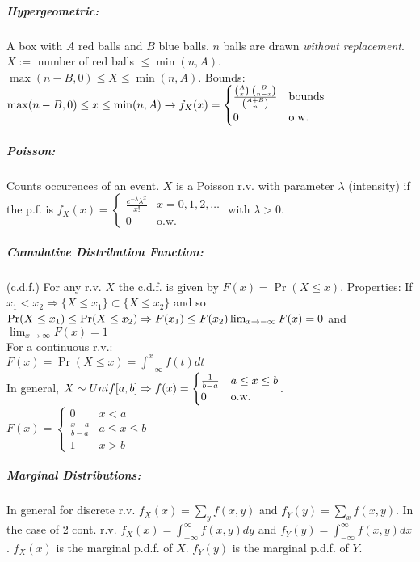 \documentclass[landscape,10pt]{article}
\begin{document}
\begin{multicols}{4}
    \subparagraph*{Hypergeometric: } A box with \(A\) red balls and \(B\) blue balls. \(n\) balls are drawn \textit{without replacement}. \(X :=\) number of red balls \(\leq \min(n, A)\). \(\max(n-B, 0) \leq X \leq \min(n,A)\). Bounds: \(\max(n-B,0) \leq x \leq \min(n,A)\\\rightarrow f_X(x) = 
    \begin{cases}
    \frac{ {A \choose x} \cdot {B \choose n - x}}{{A + B \choose n}}     & \text{bounds}    \\
    0   &   \text{o.w.}
    \end{cases}
    \)
        
    \subparagraph*{Poisson: }
        Counts occurences of an event. \(X\) is a Poisson r.v. with parameter \(\lambda\) (intensity) if the p.f. is \(f_X(x) = \begin{cases} \frac{e^{-\lambda}\lambda^x}{x!} & x=0,1,2,\ldots \\ 0 & \text{o.w.} \end{cases}\) with \(\lambda>0\).

    \subparagraph*{Cumulative Distribution Function: } 
        (c.d.f.) For any r.v. \(X\) the c.d.f. is given by \(F(x) = \Pr(X \leq x)\). Properties: 
        If \(x_1 < x_2 \Rightarrow \{X \leq x_1 \} \subset \{X \leq x_2 \}\) and so \(\Pr(X \leq x_1) \leq \Pr(X \leq x_2) \Rightarrow F(x_1) \leq F(x_2) \\
        \lim_{x \to -\infty} F(x) = 0\) and \(\lim_{x \to \infty} F(x) = 1\)\\
        For a continuous r.v.: \\\(F(x) = \Pr(X \leq x) = \int_{-\infty}^{x}f(t)dt\) \\ 
    In general, \(X \sim Unif[a,b] \Rightarrow \\f(x) = \begin{cases} \frac{1}{b-a} & a \leq x \leq b \\ 0 & \text{o.w.} \end{cases}\). 
    \\\(F(x) = \begin{cases} 0 & x < a \\ \frac{x-a}{b-a} & a \leq x \leq b \\ 1 & x > b \end{cases}\)



    \subparagraph*{Marginal Distributions: }
        In general for discrete r.v. \(f_X(x) = \sum_{y}f(x,y)\) and \(f_Y(y) = \sum_{x}f(x,y)\). In the case of 2 cont. r.v. \(f_X(x) = \int_{-\infty}^{\infty}f(x,y)dy\) and \(f_Y(y) = \int_{-\infty}^{\infty}f(x,y)dx\). \(f_X(x)\) is the marginal p.d.f. of \(X\). \(f_Y(y)\) is the marginal p.d.f. of \(Y\).


\end{multicols}
\end{document}
